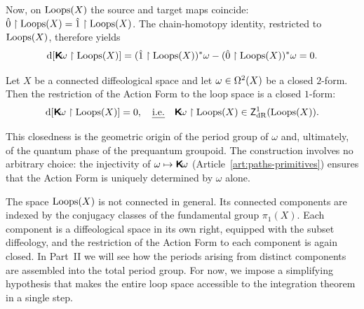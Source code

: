 \documentclass[10pt,reqno,letterpaper,twoside]{amsbook}
\begin{document}
\begin{article}
    Now, on $\operatorname{Loops}(X)$ the source and target maps coincide:
    $\hat 0 \restriction \operatorname{Loops}(X) = \hat 1 \restriction \operatorname{Loops}(X)$.
    The chain-homotopy identity,
    restricted to $\operatorname{Loops}(X)$,
    therefore yields
    \[
      \mathrm{d}[\boldsymbol{\mathsf{K}}\!\omega \restriction \operatorname{Loops}(X)]
      = (\hat 1 \restriction \operatorname{Loops}(X))^*\omega
      - (\hat 0 \restriction \operatorname{Loops}(X))^*\omega
      = 0.
      \]%
    
    \begin{proposition}
      Let $X$ be a connected diffeological space and let
      $\omega \in \Omega^2(X)$ be a closed $2$-form.
      Then the restriction of the Action Form to the loop space
      is a closed $1$-form:
      \[
        \mathrm{d}[\boldsymbol{\mathsf{K}}\!\omega \restriction \operatorname{Loops}(X)] = 0,
        \quad\text{{\em i.e.\/}}\quad
        \boldsymbol{\mathsf{K}}\!\omega \restriction \operatorname{Loops}(X) \in \mathsf{Z}_\mathrm{dR}^1(\operatorname{Loops}(X)).
        \]%
    \end{proposition}
    
    This closedness is the geometric origin of the period group of $\omega$
    and, ultimately, of the quantum phase of the prequantum groupoid.
    The construction involves no arbitrary choice:
    the injectivity of $\omega \mapsto \boldsymbol{\mathsf{K}}\!\omega$
    (Article~\ref{art:paths-primitives})
    ensures that the Action Form is uniquely determined by $\omega$ alone.
    
    The space $\operatorname{Loops}(X)$ is not connected in general.
    Its connected components are indexed by the conjugacy classes
    of the fundamental group $\pi_1(X)$.
    Each component is a diffeological space in its own right,
    equipped with the subset diffeology,
    and the restriction of the Action Form to each component is again closed.
    In Part~II we will see how the periods arising from distinct components
    are assembled into the total period group.
    For now,
    we impose a simplifying hypothesis that makes the entire loop space
    accessible to the integration theorem in a single step.
  \end{article}
  
\end{document}
